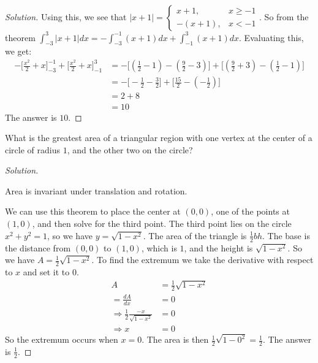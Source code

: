 \documentclass[crop=false,class=book]{standalone}
\begin{document}
        \begin{proof}[Solution]
            Using this, we see that
            $|x+1|=\begin{cases}%
                x+1,&x\geq -1\\%
                -(x+1),&x< -1%
            \end{cases}$.
            So from the theorem
            $\int_{-3}^{3}|x+1|dx=%
            -\int_{-3}^{-1}(x+1)dx+\int_{-1}^{3}(x+1)dx$.
            Evaluating this, we get:
            \begin{align*}
                -\bigg[\frac{x^2}{2}+x\bigg]_{-3}^{-1}
                +\bigg[\frac{x^2}{2}+x\bigg]_{-1}^{3}
                &=-\bigg[(\frac{1}{2}-1)-(\frac{9}{2}-3)\bigg]
                +\bigg[(\frac{9}{2}+3)-(\frac{1}{2}-1)\bigg]\\
                &=-\bigg[-\frac{1}{2}-\frac{3}{2}\bigg]
                +\bigg[\frac{15}{2}-(-\frac{1}{2})\bigg]\\
                &=2+8\\ 
                &=10
            \end{align*}
            The answer is $10$.
        \end{proof}
        \begin{problem}
        What is the greatest area of a triangular region with one vertex at the center of a circle of radius $1$, and the other two on the circle?
        \end{problem}
        \begin{proof}[Solution]
        \begin{theorem*}
        Area is invariant under translation and rotation.
        \end{theorem*}
        We can use this theorem to place the center at $(0,0)$, one of the points at $(1,0)$, and then solve for the third point. The third point lies on the circle $x^2+y^2 = 1$, so we have $y = \sqrt{1-x^2}$. The area of the triangle is $\frac{1}{2}bh$. The base is the distance from $(0,0)$ to $(1,0)$, which is $1$, and the height is $\sqrt{1-x^2}$. So we have $A = \frac{1}{2}\sqrt{1-x^2}$. To find the extremum we take the derivative with respect to $x$ and set it to $0$.
        \begin{align*}
            A&=\frac{1}{2}\sqrt{1-x^{2}}\\
            =\frac{dA}{dx}&=0\\
            \Rightarrow\frac{1}{2}\frac{-x}{\sqrt{1-x^{2}}}&=0\\
            \Rightarrow x&=0
        \end{align*}
        So the extremum occurs when $x=0$. The area is then $\frac{1}{2}\sqrt{1-0^2} = \frac{1}{2}$. The answer is $\frac{1}{2}$.
        \end{proof}
\end{document}
